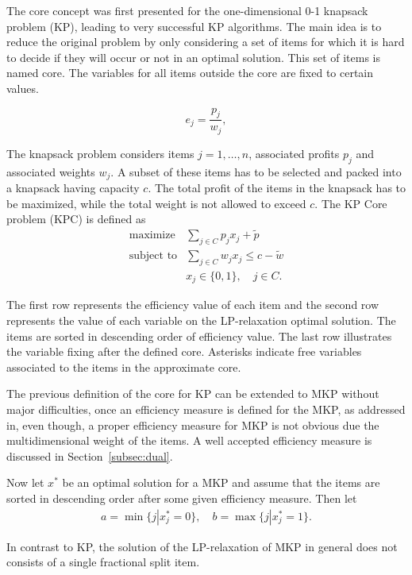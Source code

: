 
The core concept was first presented for the one-dimensional 0-1 knapsack problem (KP),
leading to very successful KP algorithms.
The main idea is to reduce the original problem by only considering a set of
items for which it is hard to decide if they will occur or not in an optimal solution.
This set of items is named core.
The variables for all items outside the core are fixed to certain values.

\begin{equation}
  e_j = \frac{p_j}{w_j},
\end{equation}

The knapsack problem considers items $j = 1, \ldots, n$, associated profits $p_j$ and
associated weights $w_j$.
A subset of these items has to be selected and packed into a knapsack having capacity $c$.
The total profit of the items in the knapsack has to be maximized, while the
total weight is not allowed to exceed $c$.
The KP Core problem (KPC) is defined as
\begin{align}
  \text{maximize} & \sum_{j \in C} p_j x_j  + \tilde{p}\\
  \text{subject to} & \sum_{j \in C} w_{j} x_j \leqslant c - \tilde{w}\\
  & x_j \in \{0, 1\}, \quad j \in C.
\end{align}

The first row represents the efficiency value of each item and the second row
represents the value of each variable on the LP-relaxation optimal solution.
The items are sorted in descending order of efficiency value.
The last row illustrates the variable fixing after the defined core.
Asterisks indicate free variables associated to the items in the
approximate core.

The previous definition of the core for KP can be extended to MKP without major
difficulties, once an efficiency measure is defined for the MKP,
as addressed in, even though,
a proper efficiency measure for MKP is not obvious due the
multidimensional weight of the items.
A well accepted efficiency measure is discussed in Section~\ref{subsec:dual}.

Now let $x^*$ be an optimal solution for a MKP and assume that the items are
sorted in descending order after some given efficiency measure. Then let
\begin{align}
  a = \min \{ j | x_j^* = 0 \}, \quad b = \max \{ j | x_j^* = 1 \}.
\end{align}

In contrast to KP, the solution of the LP-relaxation of MKP in general does not
consists of a single fractional split item.
